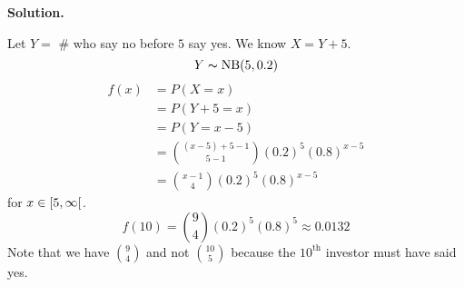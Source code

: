 \textbf{Solution.}

Let $ Y= $ \# who say no before $ 5 $ say yes. We know $ X=Y+5 $.
\[ Y\thicksim\operatorname{NB}(5,0.2) \]
\begin{align*}
    f(x) & =P(X=x)                                   \\
         & =P(Y+5=x)                                 \\
         & =P(Y=x-5)                                 \\
         & =\binom{(x-5)+5-1}{5-1}(0.2)^5(0.8)^{x-5} \\
         & =\binom{x-1}{4}(0.2)^5(0.8)^{x-5}
\end{align*}
for $ x\in\rinterval{5}{\infty} $.
\[ f(10)=\binom{9}{4}(0.2)^5(0.8)^5\approx 0.0132\]
Note that we have $ \binom{9}{4} $ and not $ \binom{10}{5} $ because
the $10^{\text{th}}$ investor must have said yes.
